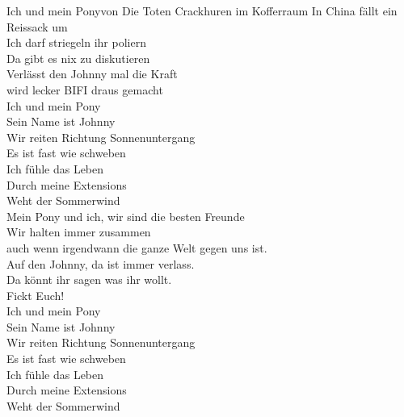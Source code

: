 \begin{lied}{Ich und mein Pony}{von Die Toten Crackhuren im Kofferraum}
In China fällt ein Reissack um\\
Ich darf striegeln ihr poliern\\
Da gibt es nix zu diskutieren\\
Verlässt den Johnny mal die Kraft\\
wird lecker BIFI draus gemacht\\
Ich und mein Pony\\
Sein Name ist Johnny\\
Wir reiten Richtung Sonnenuntergang\\
Es ist fast wie schweben\\
Ich fühle das Leben\\
Durch meine Extensions\\
Weht der Sommerwind\\
Mein Pony und ich, wir sind die besten Freunde\\
Wir halten immer zusammen\\
auch wenn irgendwann die ganze Welt gegen uns ist.\\
Auf den Johnny, da ist immer verlass.\\
Da könnt ihr sagen was ihr wollt.\\
Fickt Euch!\\
\vspace{1em}
Ich und mein Pony\\
Sein Name ist Johnny\\
Wir reiten Richtung Sonnenuntergang\\
Es ist fast wie schweben\\
\vspace{1em}
\vspace{1em}
Ich fühle das Leben\\
Durch meine Extensions\\
Weht der Sommerwind\\
\end{lied}

